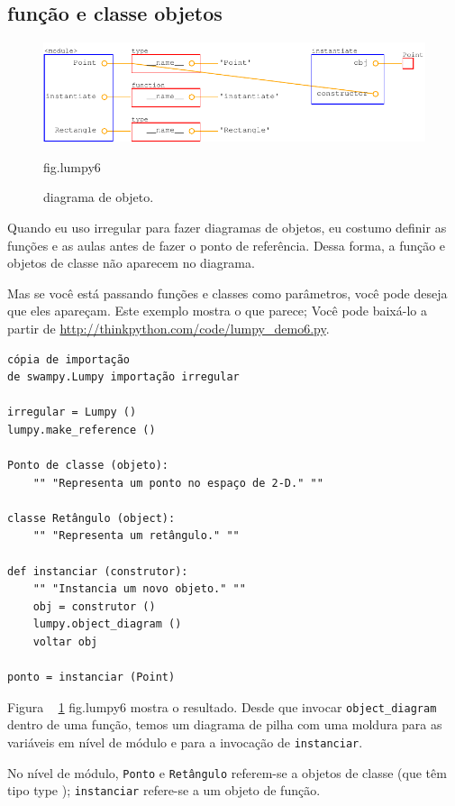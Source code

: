\documentclass[10pt]{book}
\begin{document}
\begin{exercise}
\begin{v erbatim}
{\section{função e classe objetos}

\begin{figure}
\centerline
{\includegraphics[scale = 0.7] {figs/lumpydemo6.pdf}}
\caption{diagrama de objeto.}
\label{} fig.lumpy6
\end{figure}

Quando eu uso irregular para fazer diagramas de objetos, eu costumo definir as funções
e as aulas antes de fazer o ponto de referência. Dessa forma, a função
e objetos de classe não aparecem no diagrama.

Mas se você está passando funções e classes como parâmetros, você pode
deseja que eles apareçam. Este exemplo mostra o que parece;
Você pode baixá-lo a partir de
\url{http://thinkpython.com/code/lumpy_demo6.py}.

\begin{verbatim}
cópia de importação
de swampy.Lumpy importação irregular

irregular = Lumpy ()
lumpy.make_reference ()

Ponto de classe (objeto):
    "" "Representa um ponto no espaço de 2-D." ""

classe Retângulo (object):
    "" "Representa um retângulo." ""

def instanciar (construtor):
    "" "Instancia um novo objeto." ""
    obj = construtor ()
    lumpy.object_diagram ()
    voltar obj

ponto = instanciar (Point)
\end{verbatim}

Figura ~ \ref {} fig.lumpy6 mostra o resultado. Desde que invocar
\Verb "object_diagram" dentro de uma função, temos um diagrama de pilha
com uma moldura para as variáveis ​​em nível de módulo e para a invocação
de {\tt instanciar}.

No nível de módulo, {\tt Ponto} e {\tt Retângulo} referem-se a
objetos de classe (que têm tipo {type \tt}); {\tt instanciar}
refere-se a um objeto de função.

}
\end{v erbatim}
\end{exercise}
\end{document}
